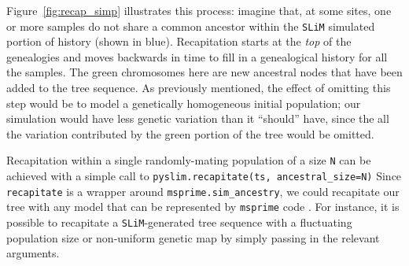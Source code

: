 \documentclass[12pt]{article}
\newcommand{\msprime}[0]{\texttt{msprime}\xspace}
\newcommand{\slim}[0]{\texttt{SLiM}\xspace}
\newcommand*{\ie}{i.e.\xcomma}
\begin{document}
Figure~\ref{fig:recap_simp} illustrates this process: imagine that, at some sites, one or more samples do not share
a common ancestor within the \slim simulated portion of history (shown in blue).
Recapitation starts at the \textit{top} of the genealogies and moves backwards in time
to fill in a genealogical history for all the samples.
The green chromosomes here are new ancestral nodes that have been added to the tree sequence.
As previously mentioned, the effect of omitting this step would be to model a genetically homogeneous initial population;
our simulation would have less genetic variation than it ``should'' have, since the all the variation
contributed by the green portion of the tree would be omitted.


Recapitation within a single randomly-mating population of a size \verb|N|
can be achieved with a simple call to \verb|pyslim.recapitate(ts, ancestral_size=N)|
Since \verb|recapitate| is a wrapper around
\verb|msprime.sim_ancestry|, we could recapitate our tree with any model that can be represented by \msprime code \citep{baumdicker_efficient_2022}.
For instance, it is possible to recapitate a \slim-generated tree sequence with a fluctuating population size
or non-uniform genetic map by simply passing in the relevant arguments.
\end{document}
